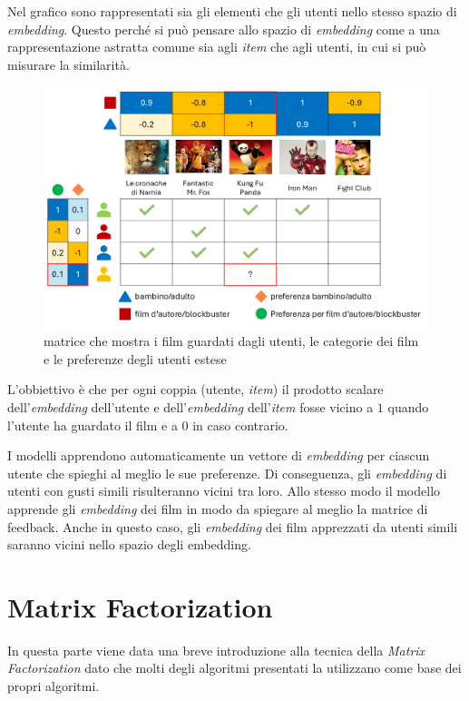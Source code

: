 Nel grafico sono rappresentati sia gli elementi che gli utenti nello stesso spazio di \textit{embedding}. Questo perché si può pensare allo spazio di \textit{embedding} come a una rappresentazione astratta comune sia agli \textit{item} che agli utenti, in cui si può misurare la similarità.

\begin{figure}[H]
    \centering
    \includegraphics[scale=0.4]{figures/collaborative_filtering/2D_matrix.PNG}
    \caption{matrice che mostra i film guardati dagli utenti, le categorie dei film e le preferenze degli utenti estese}
    \label{fig:2D_matrix}
\end{figure}

L'obbiettivo è che per ogni coppia (utente, \textit{item}) il prodotto scalare dell'\textit{embedding} dell'utente e dell'\textit{embedding} dell'\textit{item} fosse vicino a $1$ quando l'utente ha guardato il film e a $0$ in caso contrario.

I modelli apprendono automaticamente un vettore di \textit{embedding} per ciascun utente che spieghi al meglio le sue preferenze. Di conseguenza, gli \textit{embedding} di utenti con gusti simili risulteranno vicini tra loro. Allo stesso modo il modello apprende gli \textit{embedding} dei film in modo da spiegare al meglio la matrice di feedback. Anche in questo caso, gli \textit{embedding} dei film apprezzati da utenti simili saranno vicini nello spazio degli embedding.

\section{Matrix Factorization}

In questa parte viene data una breve introduzione alla tecnica della \textit{Matrix Factorization} dato che molti degli algoritmi presentati la utilizzano come base dei propri algoritmi.

